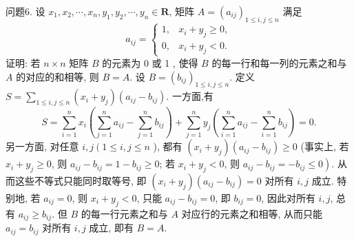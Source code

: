 问题6. 设 $x_1, x_2, \cdots, x_n, y_1, y_2, \cdots, y_n \in \mathbf{R}$, 矩阵 $A=\left(a_{i j}\right)_{1 \leqslant i, j \leqslant n}$ 满足
$$
a_{i j}= \begin{cases}1, & x_i+y_j \geqslant 0, \\ 0, & x_i+y_j<0 .\end{cases}
$$
证明: 若 $n \times n$ 矩阵 $B$ 的元素为 0 或 1 , 使得 $B$ 的每一行和每一列的元素之和与 $A$ 的对应的和相等, 则 $B=A$. 
设 $B=\left(b_{i j}\right)_{1 \leqslant i, j \leqslant n}$. 定义 $S=\sum_{1 \leqslant i, j \leqslant n}\left(x_i+y_j\right)\left(a_{i j}-b_{i j}\right)$.
一方面,有
$$
S=\sum_{i=1}^n x_i\left(\sum_{j=1}^n a_{i j}-\sum_{j=1}^n b_{i j}\right)+\sum_{j=1}^n y_j\left(\sum_{i=1}^n a_{i j}-\sum_{i=1}^n b_{i j}\right)=0 .
$$
另一方面, 对任意 $i, j\left(1 \leqslant i, j \leqslant n\right.$ ), 都有 $\left(x_i+y_j\right)\left(a_{i j}-b_{i j}\right) \geqslant 0$ (事实上, 若 $x_i+y_j \geqslant 0$, 则 $a_{i j}-b_{i j}=1-b_{i j} \geqslant 0$; 若 $x_i+y_j<0$, 则 $a_{i j}- \left.b_{i j}=-b_{i j} \leqslant 0\right)$.
从而这些不等式只能同时取等号, 即 $\left(x_i+y_j\right)\left(a_{i j}-b_{i j}\right)=0$ 对所有 $i, j$ 成立.
特别地, 若 $a_{i j}=0$, 则 $x_i+y_j<0$, 只能 $a_{i j}-b_{i j}=0$, 即 $b_{i j}=0$, 因此对所有 $i, j$, 总有 $a_{i j} \geqslant b_{i j}$. 但 $B$ 的每一行元素之和与 $A$ 对应行的元素之和相等, 从而只能 $a_{i j}=b_{i j}$ 对所有 $i, j$ 成立, 即有 $B=A$.


